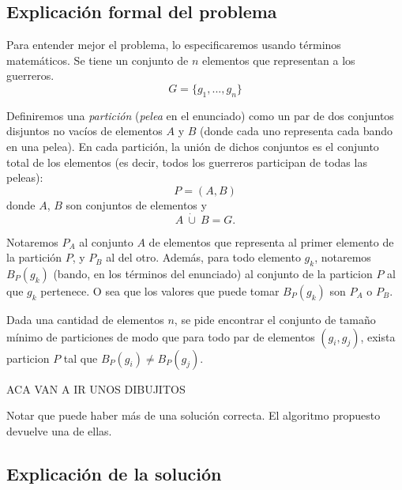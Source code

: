 
\subsection{Explicación formal del problema}

Para entender mejor el problema, lo especificaremos usando términos matemáticos. Se tiene un conjunto de $n$ elementos que representan a los guerreros. 
\[G = \{g_1,...,g_n\}\]

Definiremos una \emph{partición} (\emph{pelea} en el enunciado) como un par de dos conjuntos disjuntos no vacíos de elementos $A$ y $B$ (donde cada uno representa cada bando en una pelea). En cada partición, la unión de dichos conjuntos es el conjunto total de los elementos (es decir, todos los guerreros participan de todas las peleas):
\[ P = (A, B)\]
donde $A$, $B$ son conjuntos de elementos y  \[A \ \dot{\cup}\ B = G.\]

Notaremos $P_A$ al conjunto $A$ de elementos que representa al primer elemento de la partición $P$, y $P_B$ al del otro. Además, para todo elemento $g_k$, notaremos $B_P(g_k)$ (bando, en los t\'erminos del enunciado) al conjunto de la particion $P$ al que $g_k$ pertenece. O sea que los valores que puede tomar $B_P(g_k)$ son $P_A$ o $P_B$. 

Dada una cantidad de elementos $n$, se pide encontrar el conjunto de tamaño mínimo de particiones de modo que para todo par de elementos $(g_i, g_j)$, exista particion $P$ tal que $B_P(g_i) \neq B_P(g_j)$.

ACA VAN A IR UNOS DIBUJITOS

%

Notar que puede haber más de una solución correcta. El algoritmo propuesto devuelve una de ellas.

\subsection{Explicación de la solución}

